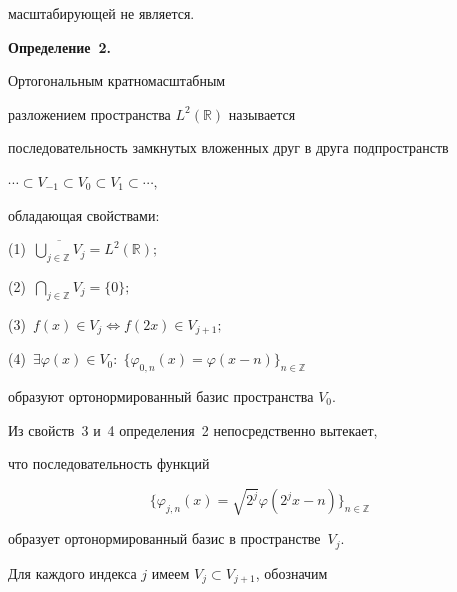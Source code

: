 масштабирующей не является.






\pagebreak





\noindent

\textbf{Определение~2.}

Ортогональным кратномасштабным

разложением пространства $L^2(\mathbb{R})$ называется

последовательность замкнутых вложенных друг в друга подпространств

$

\cdots \subset V_{-1} \subset V_0 \subset V_1 \subset \cdots,

$

обладающая свойствами:

\begin{description}

    \item (1)\  $\overline{\bigcup_ {j \in \mathbb{Z}}{V_j}}=L^2(\mathbb{R});$

    \item (2)\  $\bigcap_{j \in \mathbb{Z}}{V_j}=\{0\};$

    \item (3)\  $f(x) \in V_j \iff f(2x) \in V_{j+1};$

    \item (4)\  $\exists\varphi(x)\in V_0: \;\{\varphi_{0,n}(x)=\varphi(x-n)\}_{n \in \mathbb{Z}}$

                        образуют ортонормированный базис пространства $V_0.$

\end{description}





Из свойств~3 и~4 определения~2 непосредственно вытекает,

что последовательность функций

$$

    \{\varphi_{j,n}(x)=\sqrt{2^j}\varphi(2^{j}x-n)\}_{n \in \mathbb{Z}}

$$

образует ортонормированный базис в пространстве~$V_j$.



Для каждого индекса $j$ имеем $V_j \subset V_{j+1}$, обозначим

